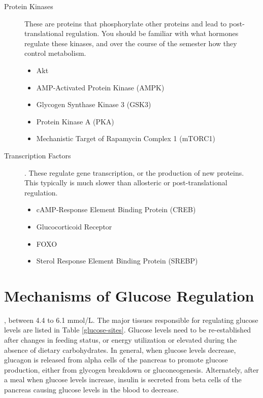\documentclass{tufte-handout}
\begin{document}
\begin{description}
	\item [Protein Kinases] These are proteins that phosphorylate other proteins and lead to post-translational regulation.  You should be familiar with what hormones regulate these kinases, and over the course of the semester how they control metabolism.
	\begin{itemize}
		\item Akt
		\item AMP-Activated Protein Kinase (AMPK)
		\item Glycogen Synthase Kinase 3 (GSK3)
		\item Protein Kinase A (PKA)
		\item Mechanistic Target of Rapamycin Complex 1 (mTORC1)
	\end{itemize}
	\item [Transcription Factors].  These regulate gene transcription, or the production of new proteins.  This typically is much slower than allosteric or post-translational regulation.
		\begin{itemize} 
			\item cAMP-Response Element Binding Protein (CREB)
			\item Glucocorticoid Receptor
			\item FOXO
			\item Sterol Response Element Binding Protein (SREBP)
		\end{itemize}
\end{description}


\section{Mechanisms of Glucose Regulation}

, between 4.4 to 6.1 mmol/L.  The major tissues responsible for regulating glucose levels are listed in Table \ref{glucose-sites}. Glucose levels need to be re-established after changes in feeding status, or energy utilization or elevated during the absence of dietary carbohydrates.  In general, when glucose levels decrease, glucagon is released from alpha cells of the pancreas to promote glucose production, either from glycogen breakdown or gluconeogenesis.  Alternately, after a meal when glucose levels increase, insulin is secreted from beta cells of the pancreas causing glucose levels in the blood to decrease.
\end{document}
